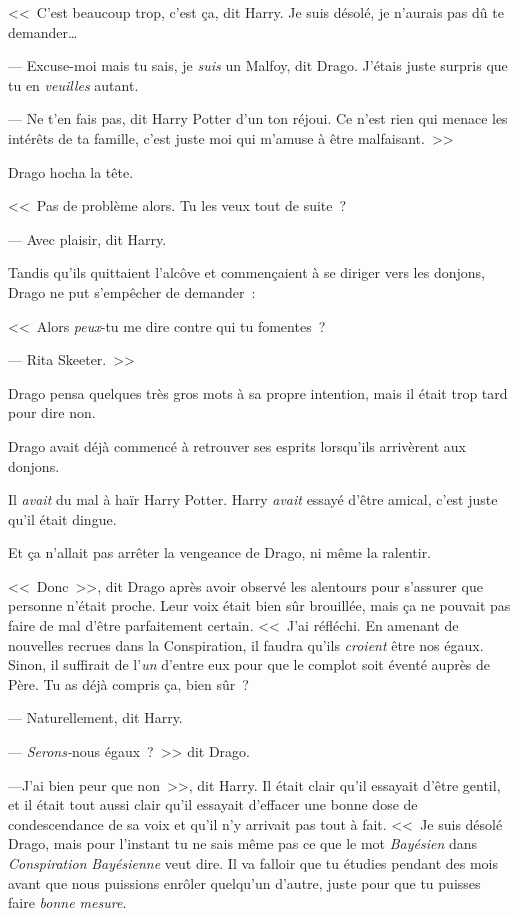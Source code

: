 <<~C'est beaucoup trop, c'est ça, dit Harry. Je suis désolé, je n'aurais pas dû te demander…

--- Excuse-moi mais tu sais, je \emph{suis} un Malfoy, dit Drago. J'étais juste surpris que tu en \emph{veuilles} autant.

--- Ne t'en fais pas, dit Harry Potter d'un ton réjoui. Ce n'est rien qui menace les intérêts de ta famille, c'est juste moi qui m'amuse à être malfaisant.~>>

Drago hocha la tête.

<<~Pas de problème alors. Tu les veux tout de suite~?

--- Avec plaisir, dit Harry.

Tandis qu'ils quittaient l'alcôve et commençaient à se diriger vers les donjons, Drago ne put s'empêcher de demander~:

<<~Alors \emph{peux}-tu me dire contre qui tu fomentes~?

--- Rita Skeeter.~>>

Drago pensa quelques très gros mots à sa propre intention, mais il était trop tard pour dire non.

\later

Drago avait déjà commencé à retrouver ses esprits lorsqu'ils arrivèrent aux donjons.

Il \emph{avait} du mal à haïr Harry Potter. Harry \emph{avait} essayé d'être amical, c'est juste qu'il était dingue.

Et ça n'allait pas arrêter la vengeance de Drago, ni même la ralentir.

<<~Donc~>>, dit Drago après avoir observé les alentours pour s'assurer que personne n'était proche. Leur voix était bien sûr brouillée, mais ça ne pouvait pas faire de mal d'être parfaitement certain. <<~J'ai réfléchi. En amenant de nouvelles recrues dans la Conspiration, il faudra qu'ils \emph{croient} être nos égaux. Sinon, il suffirait de l'\emph{un} d'entre eux pour que le complot soit éventé auprès de Père. Tu as déjà compris ça, bien sûr~?

--- Naturellement, dit Harry.

--- \emph{Serons-}nous égaux~?~>> dit Drago.

---J'ai bien peur que non~>>, dit Harry. Il était clair qu'il essayait d'être gentil, et il était tout aussi clair qu'il essayait d'effacer une bonne dose de condescendance de sa voix et qu'il n'y arrivait pas tout à fait. <<~Je suis désolé Drago, mais pour l'instant tu ne sais même pas ce que le mot \emph{Bayésien} dans \emph{Conspiration} \emph{Bayésienne} veut dire. Il va falloir que tu étudies pendant des mois avant que nous puissions enrôler quelqu'un d'autre, juste pour que tu puisses faire \emph{bonne mesure}.

